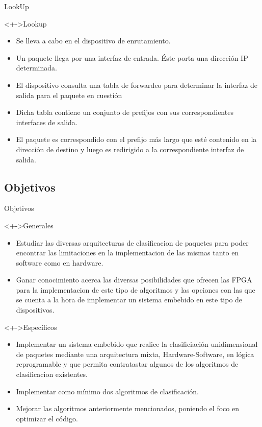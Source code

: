 \documentclass[xcolor=dvipsnames]{beamer}
\begin{document}
\begin{frame}{LookUp}

 \begin{block}<+->{Lookup}   
    \begin{itemize}
      \scriptsize
      \item Se lleva a cabo en el dispositivo de enrutamiento.
      \item Un paquete llega por una interfaz de entrada. Éste porta una dirección IP determinada.
      \item El dispositivo consulta una tabla de forwardeo para determinar la interfaz de salida para el paquete en cuestión
      \item Dicha tabla contiene un conjunto de prefijos con sus correspondientes interfaces de salida.
      \item El paquete es correspondido con el prefijo más largo que esté contenido en la dirección de destino y luego es redirigido  a la correspondiente interfaz de salida.
   
    \end{itemize}
  \end{block}

\end{frame}

\subsection{Objetivos}
\begin{frame}{Objetivos}
\begin{block}<+->{Generales}   
    \begin{itemize}
      \scriptsize
      \item Estudiar las diversas arquitecturas de clasificacion de paquetes para poder encontrar las limitaciones en la implementacion de las mismas tanto en software como en hardware. 
      \item Ganar conocimiento acerca las diversas posibilidades que ofrecen las FPGA para la implementacion de este tipo de algoritmos y las opciones con las que se cuenta a la hora de implementar un sistema embebido en este tipo de dispositivos.
    \end{itemize}
  \end{block}
  
 \begin{block}<+->{Específicos}   
    \begin{itemize}
      \scriptsize
     \item Implementar un sistema embebido que realice la clasificiación unidimensional de paquetes mediante una arquitectura mixta, Hardware-Software, en lógica reprogramable y que permita contratastar algunos de los algoritmos de clasificacion existentes. 
	\item Implementar como mínimo dos algoritmos de clasificación. 
	\item Mejorar las algoritmos anteriormente mencionados, poniendo el foco en optimizar el código.
   
    \end{itemize}
  \end{block}
 \end{frame}
\end{document}
